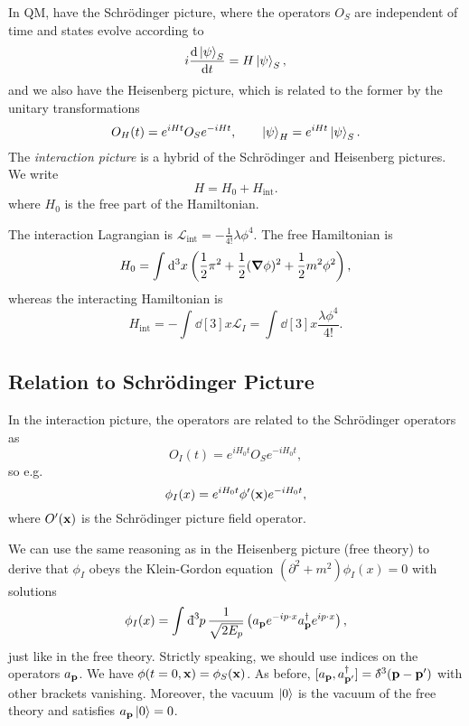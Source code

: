 In QM, have the Schrödinger picture, where the operators $O_S$ are independent of time and states evolve according to 
\begin{equation}
  i \dv{\ket{\psi}_S}{t} = H \ket{\psi}_S,
\end{equation}
and we also have the Heisenberg picture, which is related to the former by the unitary transformations
\begin{equation}
  O_H(t) = e^{iH t} O_S e^{-i H t}, \qquad \ket{\psi}_H = e^{iHt} \ket{ \psi}_S.
\end{equation}
The \emph{interaction picture} is a hybrid of the Schrödinger and Heisenberg pictures.
We write
\begin{equation}
  H = H_0 + H_{\text{int}}.
\end{equation}
where $H_0$ is the free part of the Hamiltonian.
\begin{example}
  The interaction Lagrangian is $\mathcal{L}_{\text{int}} = -\frac{1}{4!} \lambda \phi^4$. The free Hamiltonian is
  \begin{equation}
    H_0 = \int_{}^{} \dd[3]{x} \left( \frac{1}{2} \pi^2 + \frac{1}{2} (\grad \phi)^2 + \frac{1}{2} m^2 \phi^2 \right),
  \end{equation}
  whereas the interacting Hamiltonian is
  \begin{equation}
    H_{\text{int}} = - \int_{}^{} \dd[3]{x} \mathcal{L}_I = \int_{}^{} \dd[3]{x} \frac{\lambda \phi^4}{4!}.
  \end{equation}
\end{example}

\subsection{Relation to Schrödinger Picture}%
\label{sub:relation_to_schrodinger_picture}

In the interaction picture, the operators are related to the Schrödinger operators as
\begin{equation}
  O_I(t) = e^{i H_0 t} O_S e^{-i H_0 t},
\end{equation}
so e.g.
\begin{equation}
  \phi_I(x) = e^{i H_0 t}\phi'(\vb{x}) e^{-iH_0 t},
\end{equation}
where $O'(\vb{x})$ is the Schrödinger picture field operator.

We can use the same reasoning as in the Heisenberg picture (free theory) to derive that $\phi_I$ obeys the Klein-Gordon equation $(\partial^2 + m^2) \phi_I(x) = 0$ with solutions
\begin{equation}
  \phi_I(x) = \int_{}^{} \bdd[3]{p} \frac{1}{\sqrt{2E_p}} \left( a_{\vb{p}} e^{-i p \cdot x} a_{\vb{p}}^{\dagger} e^{i p \cdot x} \right),
\end{equation}
just like in the free theory. Strictly speaking, we should use indices on the operators $a_{\vb{p}}$.
We have $\phi(t = 0, \vb{x}) = \phi_S(\vb{x})$. 
As before, $[ a_{\vb{p}}, a_{\vb{p}'}^{\dagger}] = \bdelta^3 (\vb{p} - \vb{p}')$ with other brackets vanishing.
Moreover, the vacuum $\ket{0}$ is the vacuum of the free theory and satisfies $a_{\vb{p}} \ket{0} = 0$.

